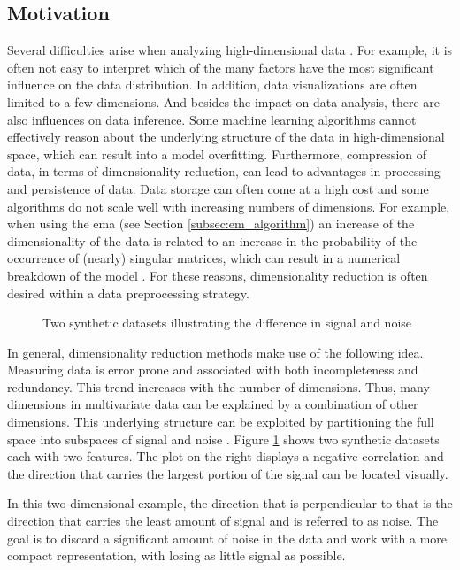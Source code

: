 \documentclass[../../../main.tex]{subfiles}
\begin{document}
\subsection{Motivation}

Several difficulties arise when analyzing high-dimensional data \cite[p.286]{dei_2020}. For example, it is often not easy to interpret which of the many factors have the most significant influence on the data distribution. In addition, data visualizations are often limited to a few dimensions. And besides the impact on data analysis, there are also influences on data inference. Some machine learning algorithms cannot effectively reason about the underlying structure of the data in high-dimensional space, which can result into a model overfitting. Furthermore, compression of data, in terms of dimensionality reduction, can lead to advantages in processing and persistence of data. Data storage can often come at a high cost and some algorithms do not scale well with increasing numbers of dimensions. For example, when using the \gls{ema} (see Section \ref{subsec:em_algorithm}) an increase of the dimensionality of the data is related to an increase in the probability of the occurrence of (nearly) singular matrices, which can result in a numerical breakdown of the model \cite[p.434]{bis_2006}. For these reasons, dimensionality reduction is often desired within a data preprocessing strategy.

\begin{figure}[b]
    \centering
    
    \caption{Two synthetic datasets illustrating the difference in signal and noise}
    \label{fig:pca_signal_noise}
\end{figure}

In general, dimensionality reduction methods make use of the following idea. Measuring data is error prone and associated with both incompleteness and redundancy. This trend increases with the number of dimensions. Thus, many dimensions in multivariate data can be explained by a combination of other dimensions. This underlying structure can be exploited by partitioning the full space into subspaces of signal and noise \cite[217]{sco_2015}. Figure \ref{fig:pca_signal_noise} shows two synthetic datasets each with two features. The plot on the right displays a negative correlation and the direction that carries the largest portion of the signal can be located visually. 

In this two-dimensional example, the direction that is perpendicular to that is the direction that carries the least amount of signal and is referred to as noise. The goal is to discard a significant amount of noise in the data and work with a more compact representation, with losing as little signal as possible.
\end{document}

